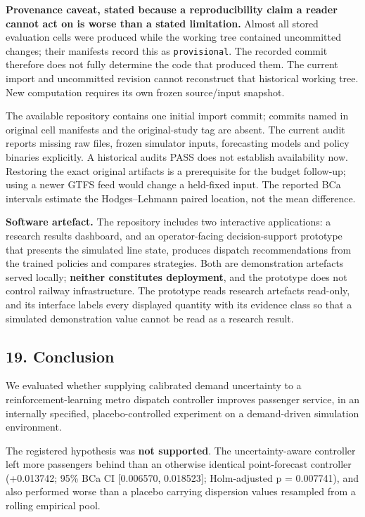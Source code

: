 \documentclass[
]{article}
\begin{document}
\textbf{Provenance caveat, stated because a reproducibility claim a
reader cannot act on is worse than a stated limitation.} Almost all
stored evaluation cells were produced while the working tree contained
uncommitted changes; their manifests record this as
\texttt{provisional}. The recorded commit therefore does not fully
determine the code that produced them. The current import and
uncommitted revision cannot reconstruct that historical working tree.
New computation requires its own frozen source/input snapshot.

The available repository contains one initial import commit; commits
named in original cell manifests and the original-study tag are absent.
The current audit reports missing raw files, frozen simulator inputs,
forecasting models and policy binaries explicitly. A historical
audit\textquotesingle s PASS does not establish availability now.
Restoring the exact original artifacts is a prerequisite for the budget
follow-up; using a newer GTFS feed would change a held-fixed input. The
reported BCa intervals estimate the Hodges--Lehmann paired location, not
the mean difference.

\textbf{Software artefact.} The repository includes two interactive
applications: a research results dashboard, and an operator-facing
decision-support prototype that presents the simulated line state,
produces dispatch recommendations from the trained policies and compares
strategies. Both are demonstration artefacts served locally;
\textbf{neither constitutes deployment}, and the prototype does not
control railway infrastructure. The prototype reads research artefacts
read-only, and its interface labels every displayed quantity with its
evidence class so that a simulated demonstration value cannot be read as
a research result.

\subsection{19. Conclusion}\label{19-conclusion}

We evaluated whether supplying calibrated demand uncertainty to a
reinforcement-learning metro dispatch controller improves passenger
service, in an internally specified, placebo-controlled experiment on a
demand-driven simulation environment.

The registered hypothesis was \textbf{not supported}. The
uncertainty-aware controller left more passengers behind than an
otherwise identical point-forecast controller (+0.013742; 95\% BCa CI
{[}0.006570, 0.018523{]}; Holm-adjusted p = 0.007741), and also
performed worse than a placebo carrying dispersion values resampled from
a rolling empirical pool.
\end{document}

